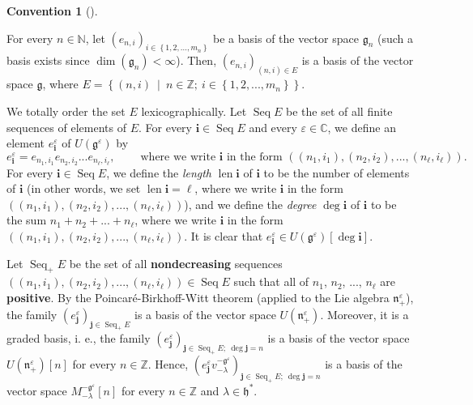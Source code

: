 \documentclass
[numbers=enddot,12pt,final,onecolumn,german,notitlepage]{scrartcl}%
\theoremstyle{definition}
\newtheorem{conv}[theo]{Convention}
\newenvironment{Convention}[1][]
{\begin{conv}[#1]\begin{leftbar}}
{\end{leftbar}\end{conv}}
\begin{document}
\begin{Convention}
\label{conv.invformnondeg.bases}For every $n\in\mathbb{N}$, let $\left(
e_{n,i}\right)  _{i\in\left\{  1,2,...,m_{n}\right\}  }$ be a basis of the
vector space $\mathfrak{g}_{n}$ (such a basis exists since $\dim\left(
\mathfrak{g}_{n}\right)  <\infty$). Then, $\left(  e_{n,i}\right)  _{\left(
n,i\right)  \in E}$ is a basis of the vector space $\mathfrak{g}$, where
$E=\left\{  \left(  n,i\right)  \ \mid\ n\in\mathbb{Z};\ i\in\left\{
1,2,...,m_{n}\right\}  \right\}  $.

We totally order the set $E$ lexicographically. Let $\operatorname*{Seq}E$ be
the set of all finite sequences of elements of $E$. For every $\mathbf{i}%
\in\operatorname*{Seq}E$ and every $\varepsilon\in\mathbb{C}$, we define an
element $e_{\mathbf{i}}^{\varepsilon}$ of $U\left(  \mathfrak{g}^{\varepsilon
}\right)  $ by%
\[
e_{\mathbf{i}}^{\varepsilon}=e_{n_{1},i_{1}}e_{n_{2},i_{2}}...e_{n_{\ell
},i_{\ell}},\ \ \ \ \ \ \ \ \ \ \text{where we write }\mathbf{i}\text{ in the
form }\left(  \left(  n_{1},i_{1}\right)  ,\left(  n_{2},i_{2}\right)
,...,\left(  n_{\ell},i_{\ell}\right)  \right)  .
\]
For every $\mathbf{i}\in\operatorname*{Seq}E$, we define the \textit{length}
$\operatorname*{len}\mathbf{i}$ of $\mathbf{i}$ to be the number of elements
of $\mathbf{i}$ (in other words, we set $\operatorname*{len}\mathbf{i}=\ell$,
where we write $\mathbf{i}$ in the form $\left(  \left(  n_{1},i_{1}\right)
,\left(  n_{2},i_{2}\right)  ,...,\left(  n_{\ell},i_{\ell}\right)  \right)
$), and we define the \textit{degree} $\deg\mathbf{i}$ of $\mathbf{i}$ to be
the sum $n_{1}+n_{2}+...+n_{\ell}$, where we write $\mathbf{i}$ in the form
$\left(  \left(  n_{1},i_{1}\right)  ,\left(  n_{2},i_{2}\right)  ,...,\left(
n_{\ell},i_{\ell}\right)  \right)  $. It is clear that $e_{\mathbf{i}%
}^{\varepsilon}\in U\left(  \mathfrak{g}^{\varepsilon}\right)  \left[
\deg\mathbf{i}\right]  $.

Let $\operatorname*{Seq}\nolimits_{+}E$ be the set of all
\textbf{nondecreasing} sequences $\left(  \left(  n_{1},i_{1}\right)  ,\left(
n_{2},i_{2}\right)  ,...,\left(  n_{\ell},i_{\ell}\right)  \right)
\in\operatorname*{Seq}E$ such that all of $n_{1}$, $n_{2}$, $...$, $n_{\ell}$
are \textbf{positive}. By the Poincar\'{e}-Birkhoff-Witt theorem (applied to
the Lie algebra $\mathfrak{n}_{+}^{\varepsilon}$), the family $\left(
e_{\mathbf{j}}^{\varepsilon}\right)  _{\mathbf{j}\in\operatorname*{Seq}%
\nolimits_{+}E}$ is a basis of the vector space $U\left(  \mathfrak{n}%
_{+}^{\varepsilon}\right)  $. Moreover, it is a graded basis, i. e., the
family $\left(  e_{\mathbf{j}}^{\varepsilon}\right)  _{\mathbf{j}%
\in\operatorname*{Seq}\nolimits_{+}E;\ \deg\mathbf{j}=n}$ is a basis of the
vector space $U\left(  \mathfrak{n}_{+}^{\varepsilon}\right)  \left[
n\right]  $ for every $n\in\mathbb{Z}$. Hence, $\left(  e_{\mathbf{j}%
}^{\varepsilon}v_{-\lambda}^{-\mathfrak{g}^{\varepsilon}}\right)
_{\mathbf{j}\in\operatorname*{Seq}\nolimits_{+}E;\ \deg\mathbf{j}=n}$ is a
basis of the vector space $M_{-\lambda}^{-\mathfrak{g}^{\varepsilon}}\left[
n\right]  $ for every $n\in\mathbb{Z}$ and $\lambda\in\mathfrak{h}^{\ast}$.


\end{Convention}
\end{document}
